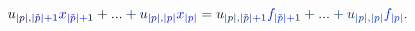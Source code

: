 \documentclass[12pt]{article}
\begin{document}
\makeatletter
\renewcommand*{\@textcolor}[3]{%
  \protect\leavevmode
  \begingroup
    \color#1{#2}#3%
  \endgroup
}
\makeatother
\begin{displaymath}
\mathcolor[RGB]{0,0,15}{u} _ { \mathcolor[RGB]{0,0,30}{|} \mathcolor[RGB]{0,0,45}{p} \mathcolor[RGB]{0,0,60}{|} \mathcolor[RGB]{0,0,75}{,} \mathcolor[RGB]{0,0,90}{|} \mathcolor[RGB]{0,0,105}{\tilde { \mathcolor[RGB]{0,0,120}{p} } } \mathcolor[RGB]{0,0,135}{|} \mathcolor[RGB]{0,0,150}{+} \mathcolor[RGB]{0,0,165}{1} } \mathcolor[RGB]{0,0,180}{x} _ { \mathcolor[RGB]{0,0,195}{|} \mathcolor[RGB]{0,0,210}{\tilde { \mathcolor[RGB]{0,0,225}{p} } } \mathcolor[RGB]{0,0,240}{|} \mathcolor[RGB]{0,0,255}{+} \mathcolor[RGB]{0,15,0}{1} } \mathcolor[RGB]{0,15,15}{+} \mathcolor[RGB]{0,15,30}{.} \mathcolor[RGB]{0,15,45}{.} \mathcolor[RGB]{0,15,60}{.} \mathcolor[RGB]{0,15,75}{+} \mathcolor[RGB]{0,15,90}{u} _ { \mathcolor[RGB]{0,15,105}{|} \mathcolor[RGB]{0,15,120}{p} \mathcolor[RGB]{0,15,135}{|} \mathcolor[RGB]{0,15,150}{,} \mathcolor[RGB]{0,15,165}{|} \mathcolor[RGB]{0,15,180}{p} \mathcolor[RGB]{0,15,195}{|} } \mathcolor[RGB]{0,15,210}{x} _ { \mathcolor[RGB]{0,15,225}{|} \mathcolor[RGB]{0,15,240}{p} \mathcolor[RGB]{0,15,255}{|} } \mathcolor[RGB]{0,30,0}{=} \mathcolor[RGB]{0,30,15}{u} _ { \mathcolor[RGB]{0,30,30}{|} \mathcolor[RGB]{0,30,45}{p} \mathcolor[RGB]{0,30,60}{|} \mathcolor[RGB]{0,30,75}{,} \mathcolor[RGB]{0,30,90}{|} \mathcolor[RGB]{0,30,105}{\tilde { \mathcolor[RGB]{0,30,120}{p} } } \mathcolor[RGB]{0,30,135}{|} \mathcolor[RGB]{0,30,150}{+} \mathcolor[RGB]{0,30,165}{1} } \mathcolor[RGB]{0,30,180}{f} _ { \mathcolor[RGB]{0,30,195}{|} \mathcolor[RGB]{0,30,210}{\tilde { \mathcolor[RGB]{0,30,225}{p} } } \mathcolor[RGB]{0,30,240}{|} \mathcolor[RGB]{0,30,255}{+} \mathcolor[RGB]{0,45,0}{1} } \mathcolor[RGB]{0,45,15}{+} \mathcolor[RGB]{0,45,30}{.} \mathcolor[RGB]{0,45,45}{.} \mathcolor[RGB]{0,45,60}{.} \mathcolor[RGB]{0,45,75}{+} \mathcolor[RGB]{0,45,90}{u} _ { \mathcolor[RGB]{0,45,105}{|} \mathcolor[RGB]{0,45,120}{p} \mathcolor[RGB]{0,45,135}{|} \mathcolor[RGB]{0,45,150}{,} \mathcolor[RGB]{0,45,165}{|} \mathcolor[RGB]{0,45,180}{p} \mathcolor[RGB]{0,45,195}{|} } \mathcolor[RGB]{0,45,210}{f} _ { \mathcolor[RGB]{0,45,225}{|} \mathcolor[RGB]{0,45,240}{p} \mathcolor[RGB]{0,45,255}{|} } \mathcolor[RGB]{0,60,0}{.}
\end{displaymath}
\end{document}
